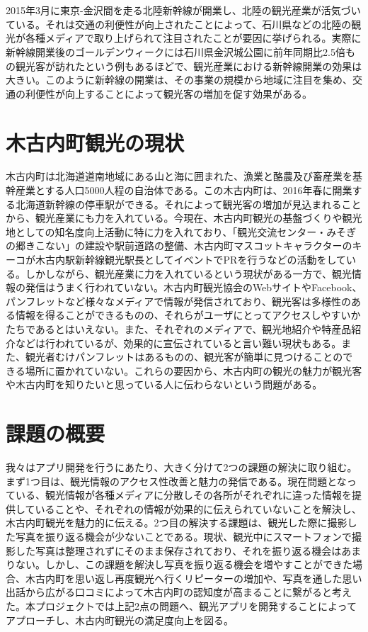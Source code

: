 \section{}
2015年3月に東京-金沢間を走る北陸新幹線が開業し、北陸の観光産業が活気づいている。それは交通の利便性が向上されたことによって、石川県などの北陸の観光が各種メディアで取り上げられて注目されたことが要因に挙げられる。実際に新幹線開業後のゴールデンウィークには石川県金沢城公園に前年同期比2.5倍もの観光客が訪れたという例もあるほどで、観光産業における新幹線開業の効果は大きい。このように新幹線の開業は、その事業の規模から地域に注目を集め、交通の利便性が向上することによって観光客の増加を促す効果がある。

\section{木古内町観光の現状}
木古内町は北海道道南地域にある山と海に囲まれた、漁業と酪農及び畜産業を基幹産業とする人口5000人程の自治体である。この木古内町は、2016年春に開業する北海道新幹線の停車駅ができる。それによって観光客の増加が見込まれることから、観光産業にも力を入れている。今現在、木古内町観光の基盤づくりや観光地としての知名度向上活動に特に力を入れており、「観光交流センター・みそぎの郷きこない」の建設や駅前道路の整備、木古内町マスコットキャラクターのキーコが木古内駅新幹線観光駅長としてイベントでPRを行うなどの活動をしている。しかしながら、観光産業に力を入れているという現状がある一方で、観光情報の発信はうまく行われていない。木古内町観光協会のWebサイトやFacebook、パンフレットなど様々なメディアで情報が発信されており、観光客は多様性のある情報を得ることができるものの、それらがユーザにとってアクセスしやすいかたちであるとはいえない。また、それぞれのメディアで、観光地紹介や特産品紹介などは行われているが、効果的に宣伝されていると言い難い現状もある。また、観光者むけパンフレットはあるものの、観光客が簡単に見つけることのできる場所に置かれていない。これらの要因から、木古内町の観光の魅力が観光客や木古内町を知りたいと思っている人に伝わらないという問題がある。

\section{課題の概要}\label{sec:gaiyou}
我々はアプリ開発を行うにあたり、大きく分けて2つの課題の解決に取り組む。まず1つ目は、観光情報のアクセス性改善と魅力の発信である。現在問題となっている、観光情報が各種メディアに分散しその各所がそれぞれに違った情報を提供していることや、それぞれの情報が効果的に伝えられていないことを解決し、木古内町観光を魅力的に伝える。2つ目の解決する課題は、観光した際に撮影した写真を振り返る機会が少ないことである。現状、観光中にスマートフォンで撮影した写真は整理されずにそのまま保存されており、それを振り返る機会はあまりない。しかし、この課題を解決し写真を振り返る機会を増やすことができた場合、木古内町を思い返し再度観光へ行くリピーターの増加や、写真を通した思い出話から広がる口コミによって木古内町の認知度が高まることに繋がると考えた。本プロジェクトでは上記2点の問題へ、観光アプリを開発することによってアプローチし、木古内町観光の満足度向上を図る。
